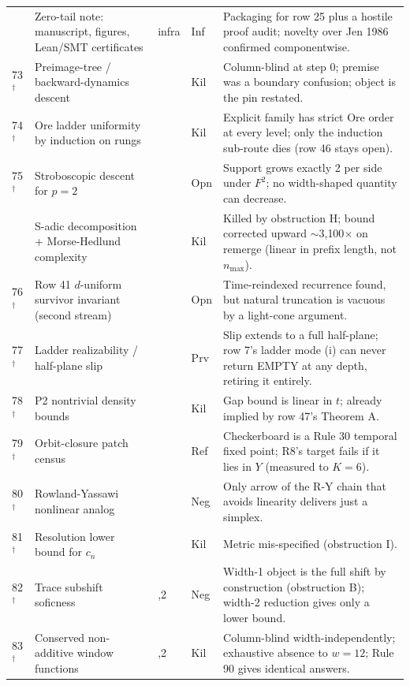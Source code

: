 \documentclass[11pt]{article}
\theoremstyle{definition}
\begin{document}
{\begin{longtable}{@{}>{\raggedleft\arraybackslash}p{0.62cm} >{\raggedright\arraybackslash}p{5.4cm} >{\centering\arraybackslash}p{1.0cm} >{\centering\arraybackslash}p{0.7cm} >{\raggedright\arraybackslash}p{8.15cm}@{}}
72 & Zero-tail note: manuscript, figures, Lean/SMT certificates & infra & Inf & Packaging for row 25 plus a hostile proof audit; novelty over Jen 1986 confirmed componentwise. \\
\mbox{73$^\dagger$} & Preimage-tree / backward-dynamics descent & 1 & Kil & Column-blind at step 0; premise was a boundary confusion; object is the pin restated. \\
\mbox{74$^\dagger$} & Ore ladder uniformity by induction on rungs & 1 & Kil & Explicit family has strict Ore order at every level; only the induction sub-route dies (row 46 stays open). \\
\mbox{75$^\dagger$} & Stroboscopic descent for $p=2$ & 1 & Opn & Support grows exactly 2 per side under $F^2$; no width-shaped quantity can decrease. \\
76 & S-adic decomposition + Morse-Hedlund complexity & 1 & Kil & Killed by obstruction H; bound corrected upward $\sim$3{,}100$\times$ on remerge (linear in prefix length, not $n_{\max}$). \\
\mbox{76$^\dagger$} & Row 41 $d$-uniform survivor invariant (second stream) & 1 & Opn & Time-reindexed recurrence found, but natural truncation is vacuous by a light-cone argument. \\
\mbox{77$^\dagger$} & Ladder realizability / half-plane slip & 1 & Prv & Slip extends to a full half-plane; row 7's ladder mode (i) can never return EMPTY at any depth, retiring it entirely. \\
\mbox{78$^\dagger$} & P2 nontrivial density bounds & 2 & Kil & Gap bound is linear in $t$; already implied by row 47's Theorem A. \\
\mbox{79$^\dagger$} & Orbit-closure patch census & 2 & Ref & Checkerboard is a Rule 30 temporal fixed point; R8's target fails if it lies in $Y$ (measured to $K=6$). \\
\mbox{80$^\dagger$} & Rowland-Yassawi nonlinear analog & 2 & Neg & Only arrow of the R-Y chain that avoids linearity delivers just a simplex. \\
\mbox{81$^\dagger$} & Resolution lower bound for $c_n$ & 3 & Kil & Metric mis-specified (obstruction I). \\
\mbox{82$^\dagger$} & Trace subshift soficness & 1,2 & Neg & Width-1 object is the full shift by construction (obstruction B); width-2 reduction gives only a lower bound. \\
\mbox{83$^\dagger$} & Conserved non-additive window functions & 1,2 & Kil & Column-blind width-independently; exhaustive absence to $w=12$; Rule 90 gives identical answers. \\

\end{longtable}}
\end{document}
